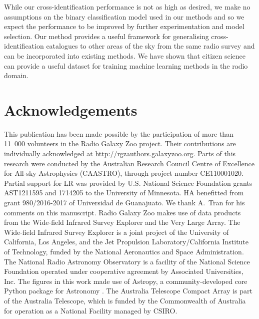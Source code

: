 \documentclass[fleqn,usenatbib,usedcolumn]{mnras}
\newcommand{\edited}[1]{#1}
\begin{document}
  While our cross-identification performance is not as high as desired, we
  make no assumptions on the binary classification model used in our methods
  and so we expect the performance to be improved by further experimentation
  and model selection. Our method provides a useful framework for generalising
  cross-identification catalogues to other areas of the sky from the same
  radio survey and can be incorporated into existing methods. \edited{We have
  shown that citizen science can provide a useful dataset for training machine
  learning methods in the radio domain.}

\section{Acknowledgements}

  This publication has been made possible by the participation of more than
  11~000 volunteers in the Radio Galaxy Zoo project. Their contributions are
  individually acknowledged at \url{http://rgzauthors.galaxyzoo.org}. Parts of
  this research were conducted by the Australian Research Council Centre of
  Excellence for All-sky Astrophysics (CAASTRO), through project number
  CE110001020. Partial support for LR was provided by U.S. National Science
  Foundation grants AST1211595 and 1714205 to the University of Minnesota. HA
  benefitted from grant 980/2016-2017 of Universidad de Guanajuato. We thank
  A.~Tran for his comments on this manuscript. Radio Galaxy Zoo makes use of
  data products from the Wide-field Infrared Survey Explorer and the Very
  Large Array. The Wide-field Infrared Survey Explorer is a joint project of
  the University of California, Los Angeles, and the Jet Propulsion
  Laboratory/California Institute of Technology, funded by the National
  Aeronautics and Space Administration. The National Radio Astronomy
  Observatory is a facility of the National Science Foundation operated under
  cooperative agreement by Associated Universities, Inc. The figures
  in this work made use of Astropy, a community-developed core Python package
  for Astronomy \citep{astropy}. The Australia Telescope Compact Array is part
  of the Australia Telescope, which is funded by the Commonwealth of Australia
  for operation as a National Facility managed by CSIRO.

%



\end{document}
